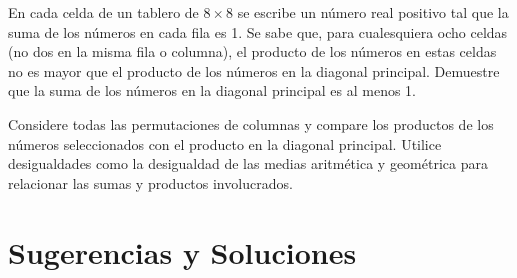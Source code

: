\documentclass[11pt]{scrartcl}
\begin{document}
\begin{problem} En cada celda de un tablero de \(8 \times 8\) se escribe un número real positivo tal que la suma de los números en cada fila es 1. Se sabe que, para cualesquiera ocho celdas (no dos en la misma fila o columna), el producto de los números en estas celdas no es mayor que el producto de los números en la diagonal principal. Demuestre que la suma de los números en la diagonal principal es al menos 1.
\begin{hint}
Considere todas las permutaciones de columnas y compare los productos de los números seleccionados con el producto en la diagonal principal. Utilice desigualdades como la desigualdad de las medias aritmética y geométrica para relacionar las sumas y productos involucrados.
\end{hint}
\end{problem}


\section{Sugerencias y Soluciones}
\begin{enumerate}

\end{enumerate}
\end{document}
